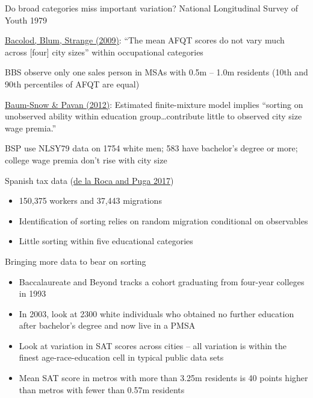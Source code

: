 \documentclass[10pt,notes=hide]{beamer}
\begin{document}
\begin{frame}{Do broad categories miss important variation?}
National Longitudinal Survey of Youth 1979
\begin{itemize}
{\small	\item \href{http://econpapers.repec.org/article/eeejuecon/v_3a65_3ay_3a2009_3ai_3a2_3ap_3a136-153.htm}{Bacolod, Blum, Strange (2009)}: ``The mean AFQT scores do not vary much across [four] city sizes'' within occupational categories
	\item BBS observe only one sales person in MSAs with 0.5m -- 1.0m residents (10th and 90th percentiles of AFQT are equal) \hyperlink{BBS2009tab5}{}
	\item \href{https://ideas.repec.org/a/oup/restud/v79y2012i1p88-127.html}{Baum-Snow \& Pavan (2012)}: Estimated finite-mixture model implies ``sorting on unobserved ability within education group\dots contribute little to observed city size wage premia.''
	\item BSP use NLSY79 data on 1754 white men; 583 have bachelor's degree or more; college wage premia don't rise with city size \hyperlink{BSPvsCensus}{}
}
\end{itemize} 
Spanish tax data (\href{https://academic.oup.com/restud/article/84/1/106/2669971}{de la Roca and Puga 2017})
\begin{itemize}
	\item 150,375 workers and 37,443 migrations
	\item Identification of sorting relies on random migration conditional on observables
	\item Little sorting within five educational categories
\end{itemize}
\hypertarget{NLSY_main}{}
\end{frame}
\begin{frame}{Bringing more data to bear on sorting}
\begin{itemize}
	\item Baccalaureate and Beyond tracks a cohort graduating from four-year colleges in 1993 
	\item In 2003, look at 2300 white individuals who obtained no further education after bachelor's degree and now live in a PMSA
	\item Look at variation in SAT scores across cities -- all variation is within the finest age-race-education cell in typical public data sets
	\item Mean SAT score in metros with more than 3.25m residents is 40 points higher than metros with fewer than 0.57m residents
\end{itemize}
\end{frame}
\end{document}
